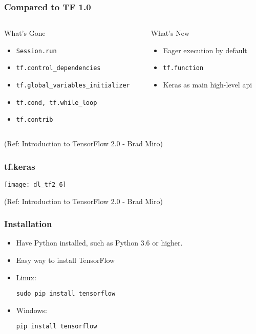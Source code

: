\begin{frame}[fragile] \frametitle{Compared to TF 1.0}

\begin{columns}
    \begin{column}[T]{0.6\linewidth}
	What’s Gone
      \begin{itemize}
		\item \lstinline|Session.run|
		\item \lstinline|tf.control_dependencies|
		\item \lstinline|tf.global_variables_initializer|
		\item \lstinline|tf.cond, tf.while_loop|
		\item \lstinline|tf.contrib|
	  \end{itemize}

    \end{column}
    \begin{column}[T]{0.4\linewidth}
	What’s New
      \begin{itemize}
		\item Eager execution by default
		\item \lstinline|tf.function|
		\item Keras as main high-level api
	  \end{itemize}
    \end{column}
  \end{columns}

\tiny{(Ref: Introduction to TensorFlow 2.0 - Brad Miro)}
\end{frame}

\begin{frame}[fragile] \frametitle{tf.keras}

\begin{center}
\texttt{[image: dl\_tf2\_6]}
\end{center}


\tiny{(Ref: Introduction to TensorFlow 2.0 - Brad Miro)}
\end{frame}


\begin{frame}[fragile] \frametitle{Installation}

\begin{itemize}
\item Have Python installed, such as Python 3.6 or higher.
\item Easy way to install TensorFlow
\item Linux:
\begin{lstlisting}
sudo pip install tensorflow
\end{lstlisting}
\item Windows:
\begin{lstlisting}
pip install tensorflow
\end{lstlisting}
\end{itemize}

\end{frame}

